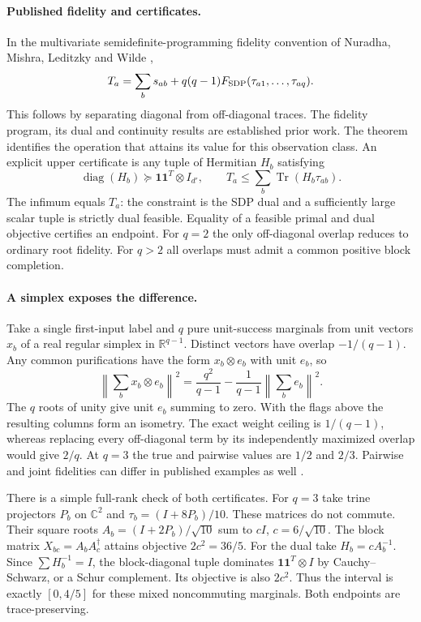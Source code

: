 \documentclass[11pt,letterpaper]{article}
\newcommand{\tr}{\operatorname{Tr}}\newcommand{\ket}[1]{\lvert#1\rangle}\newcommand{\proj}[1]{\ket{#1}\!\langle#1\rvert}
\begin{document}
\paragraph{Published fidelity and certificates.}
In the multivariate semidefinite-programming fidelity convention of Nuradha, Mishra, Leditzky and Wilde \cite[Def.~5.8, Rem.~5.9, Prop.~5.10]{multi},
\[
 T_a=\sum_bs_{ab}+q(q-1)F_{\rm SDP}(\tau_{a1},\ldots,\tau_{aq}).
\]
This follows by separating diagonal from off-diagonal traces. The fidelity program, its dual and continuity results are established prior work. The theorem identifies the operation that attains its value for this observation class. An explicit upper certificate is any tuple of Hermitian $H_b$ satisfying
\[
 \operatorname{diag}(H_b)\succeq \mathbf1\mathbf1^T\otimes I_{d'},
 \qquad T_a\le\sum_b\tr(H_b\tau_{ab}).
\]
The infimum equals $T_a$: the constraint is the SDP dual and a sufficiently large scalar tuple is strictly dual feasible. Equality of a feasible primal and dual objective certifies an endpoint. For $q=2$ the only off-diagonal overlap reduces to ordinary root fidelity. For $q>2$ all overlaps must admit a common positive block completion.

\paragraph{A simplex exposes the difference.}
Take a single first-input label and $q$ pure unit-success marginals from unit vectors $x_b$ of a real regular simplex in $\mathbb R^{q-1}$. Distinct vectors have overlap $-1/(q-1)$. Any common purifications have the form $x_b\otimes e_b$ with unit $e_b$, so
\[
 \left\|\sum_b x_b\otimes e_b\right\|^2
   =\frac{q^2}{q-1}-\frac1{q-1}\left\|\sum_b e_b\right\|^2 .
\]
The $q$ roots of unity give unit $e_b$ summing to zero. With the flags above the resulting columns form an isometry. The exact weight ceiling is $1/(q-1)$, whereas replacing every off-diagonal term by its independently maximized overlap would give $2/q$. At $q=3$ the true and pairwise values are $1/2$ and $2/3$. Pairwise and joint fidelities can differ in published examples as well \cite[Sec.~5.5.1]{multi}.

There is a simple full-rank check of both certificates. For $q=3$ take trine projectors $P_b$ on $\mathbb C^2$ and $\tau_b=(I+8P_b)/10$. These matrices do not commute. Their square roots $A_b=(I+2P_b)/\sqrt{10}$ sum to $cI$, $c=6/\sqrt{10}$. The block matrix $X_{bc}=A_b A_c^\dagger$ attains objective $2c^2=36/5$. For the dual take $H_b=cA_b^{-1}$. Since $\sum H_b^{-1}=I$, the block-diagonal tuple dominates $\mathbf1\mathbf1^T\otimes I$ by Cauchy--Schwarz, or a Schur complement. Its objective is also $2c^2$. Thus the interval is exactly $[0,4/5]$ for these mixed noncommuting marginals. Both endpoints are trace-preserving.
\end{document}
